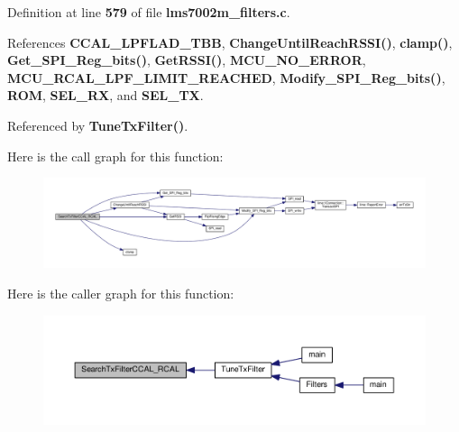 Definition at line {\bf 579} of file {\bf lms7002m\+\_\+filters.\+c}.



References {\bf C\+C\+A\+L\+\_\+\+L\+P\+F\+L\+A\+D\+\_\+\+T\+BB}, {\bf Change\+Until\+Reach\+R\+S\+S\+I()}, {\bf clamp()}, {\bf Get\+\_\+\+S\+P\+I\+\_\+\+Reg\+\_\+bits()}, {\bf Get\+R\+S\+S\+I()}, {\bf M\+C\+U\+\_\+\+N\+O\+\_\+\+E\+R\+R\+OR}, {\bf M\+C\+U\+\_\+\+R\+C\+A\+L\+\_\+\+L\+P\+F\+\_\+\+L\+I\+M\+I\+T\+\_\+\+R\+E\+A\+C\+H\+ED}, {\bf Modify\+\_\+\+S\+P\+I\+\_\+\+Reg\+\_\+bits()}, {\bf R\+OM}, {\bf S\+E\+L\+\_\+\+RX}, and {\bf S\+E\+L\+\_\+\+TX}.



Referenced by {\bf Tune\+Tx\+Filter()}.



Here is the call graph for this function\+:
\nopagebreak
\begin{figure}[H]
\begin{center}
\leavevmode
\includegraphics[width=350pt]{d2/da6/lms7002m__filters_8c_aa9caab5ff4ebdb1cec1517f380af23d6_cgraph}
\end{center}
\end{figure}




Here is the caller graph for this function\+:
\nopagebreak
\begin{figure}[H]
\begin{center}
\leavevmode
\includegraphics[width=350pt]{d2/da6/lms7002m__filters_8c_aa9caab5ff4ebdb1cec1517f380af23d6_icgraph}
\end{center}
\end{figure}


